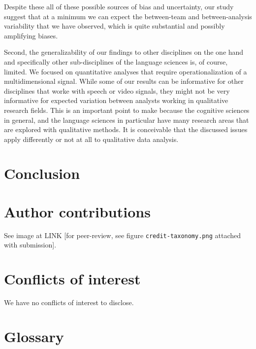 \documentclass[Review,times,sageh]{sagej}
\begin{document}
Despite these all of these possible sources of bias and uncertainty, our study suggest that at a minimum we can expect the between-team and between-analysis variability that we have observed, which is quite substantial and possibly amplifying biases.

Second, the generalizability of our findings to other disciplines on the one hand and specifically other sub-disciplines of the language sciences is, of course, limited.
We focused on quantitative analyses that require operationalization of a multidimensional signal.
While some of our results can be informative for other disciplines that worke with speech or video signals, they might not be very informative for expected variation between analysts working in qualitative research fields.
This is an important point to make because the cognitive sciences in general, and the language sciences in particular have many research areas that are explored with qualitative methods.
It is conceivable that the discussed issues apply differently or not at all to qualitative data analysis.

\hypertarget{conclusion}{%
\section{Conclusion}\label{conclusion}}

\hypertarget{author-contributions}{%
\section{Author contributions}\label{author-contributions}}

See image at LINK {[}for peer-review, see figure \texttt{credit-taxonomy.png} attached with submission{]}.

\hypertarget{conflicts-of-interest}{%
\section{Conflicts of interest}\label{conflicts-of-interest}}

We have no conflicts of interest to disclose.

\appendix

\hypertarget{glossary}{%
\section{Glossary}\label{glossary}}
\end{document}
